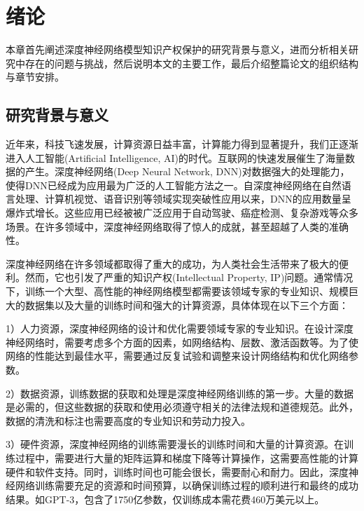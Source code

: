 
\chapter{绪论}
\label{1}

本章首先阐述深度神经网络模型知识产权保护的研究背景与意义，进而分析相关研究中存在的问题与挑战，然后说明本文的主要工作，最后介绍整篇论文的组织结构与章节安排。

\section{研究背景与意义}

近年来，科技飞速发展，计算资源日益丰富，计算能力得到显著提升，我们正逐渐进入人工智能(Artificial Intelligence, AI)的时代。互联网的快速发展催生了海量数据的产生。深度神经网络(Deep Neural Network, DNN)\cite{samek2021explaining}对数据强大的处理能力，使得DNN已经成为应用最为广泛的人工智能方法之一。自深度神经网络在自然语言处理\cite{wu2023graph,lauriola2022introduction,caucheteux2022brains}、计算机视觉\cite{buhrmester2021analysis,lindsay2021convolutional,gururaj2022deep}、语音识别\cite{dua2022developing}等领域实现突破性应用以来，DNN的应用数量呈爆炸式增长。这些应用已经被被广泛应用于自动驾驶\cite{zhang2022robustness}、癌症检测\cite{shakeel2022automatic}、复杂游戏\cite{ling2020using}等众多场景。在许多领域中，深度神经网络取得了惊人的成就，甚至超越了人类的准确性。

深度神经网络在许多领域都取得了重大的成功，为人类社会生活带来了极大的便利。然而，它也引发了严重的知识产权(Intellectual Property, IP)问题。通常情况下，训练一个大型、高性能的神经网络模型都需要该领域专家的专业知识、规模巨大的数据集以及大量的训练时间和强大的计算资源，具体体现在以下三个方面：

1）人力资源，深度神经网络的设计和优化需要领域专家的专业知识。在设计深度神经网络时，需要考虑多个方面的因素，如网络结构、层数、激活函数等。为了使网络的性能达到最佳水平，需要通过反复试验和调整来设计网络结构和优化网络参数。

2）数据资源，训练数据的获取和处理是深度神经网络训练的第一步。大量的数据是必需的，但这些数据的获取和使用必须遵守相关的法律法规和道德规范。此外，数据的清洗和标注也需要高度的专业知识和劳动力投入。

3）硬件资源，深度神经网络的训练需要漫长的训练时间和大量的计算资源。在训练过程中，需要进行大量的矩阵运算和梯度下降等计算操作，这需要高性能的计算硬件和软件支持。同时，训练时间也可能会很长，需要耐心和耐力。因此，深度神经网络训练需要充足的资源和时间预算，以确保训练过程的顺利进行和最终的成功结果。如GPT-3\cite{brown2020language}，包含了1750亿参数，仅训练成本需花费460万美元以上。


